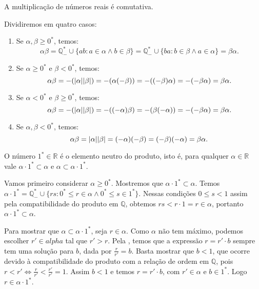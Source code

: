 \documentclass[../main.tex]{subfiles}
\begin{document}
\begin{prop}\label{reais-prop-produtoComutativo}
    A multiplicação de números reais é comutativa.
\end{prop}
\begin{dem}
    Dividiremos em quatro casos:
    \begin{enumerate}
        \item Se $\alpha, \beta \geq 0^*$, temos: \\
            \[\alpha \beta = \mathbb{Q}_{-}^* \cup \{ ab : a \in \alpha \land b \in \beta \} = \mathbb{Q}_{-}^* \cup \{ ba: b \in \beta \land a \in \alpha \} = \beta\alpha.\]
        \item Se $\alpha \geq 0^*$ e $\beta < 0^*$, temos: \\
            \[ \alpha\beta = -(\abs{\alpha}\abs{\beta}) = -(\alpha(-\beta)) = -((-\beta)\alpha) = -(-\beta\alpha) = \beta\alpha .\]
        \item Se $\alpha < 0^*$ e $\beta \geq 0^*$, temos: \\
            \[ \alpha\beta = -(\abs{\alpha}\abs{\beta}) = -((-\alpha)\beta) = -(\beta(-\alpha)) = -(-\beta\alpha) = \beta\alpha .\]
        \item Se $\alpha, \beta < 0^*$, temos: \\
            \[ \alpha \beta = \abs{\alpha}\abs{\beta} = (-\alpha)(-\beta) = (-\beta)(-\alpha) = \beta\alpha .\]
    \end{enumerate}
\end{dem}

\begin{teo}\label{reais-teo-produtoNeutro}
    O número $1^* \in \mathbb{R}$ é o elemento neutro do produto, isto é, para qualquer $\alpha \in \mathbb{R}$ vale $\alpha \cdot 1^* \subset \alpha$ e $\alpha \subset \alpha \cdot 1^*$.
\end{teo}
\begin{dem}
    Vamos primeiro considerar $\alpha \geq 0^*$. Mostremos que $\alpha \cdot 1^* \subset \alpha$. Temos $\alpha \cdot 1^* = \mathbb{Q}_{-}^* \cup \{ rs : 0^* \leq r \in \alpha \land 0^* \leq s \in 1^*  \}$. Nessas condições $0 \leq s < 1$ assim pela compatibilidade do produto em $\mathbb{Q}$, obtemos $rs < r \cdot 1 = r \in \alpha$, portanto $\alpha \cdot 1^* \subset \alpha$.

    Para mostrar que $\alpha \subset \alpha \cdot 1^*$, seja $r \in \alpha$. Como $\alpha$ não tem máximo, podemos escolher $r' \in alpha$ tal que $r' > r$. Pela , temos que a expressão $r = r' \cdot b$ sempre tem uma solução para $b$, dada por $\frac{r}{r'} = b$. Basta mostrar que $b < 1$, que ocorre devido à compatibilidade do produto com a relação de ordem em $\mathbb{Q}$, pois 
    $r < r' \iff \frac{r}{r'} < \frac{r'}{r'} = 1$. Assim $b<1$ e temos $r = r' \cdot b$, com $r' \in \alpha$ e $b \in 1^*$. Logo $r \in \alpha \cdot 1^*$.
\end{dem}
\end{document}
